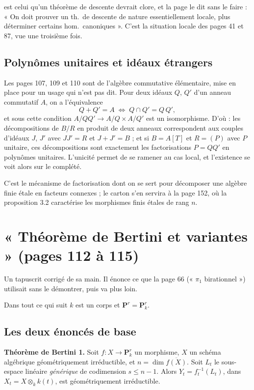 \documentclass[11pt,a4paper]{article}
\begin{document}
est celui qu'un théorème de descente devrait clore, et la page le dit sans le
faire : « On doit prouver un th.\ de descente de nature essentiellement locale,
plus déterminer certains hom.\ canoniques ». C'est la situation locale des
pages 41 et 87, vue une troisième fois.

\subsection*{Polynômes unitaires et idéaux étrangers}

Les pages 107, 109 et 110 sont de l'algèbre commutative élémentaire, mise en
place pour un usage qui n'est pas dit. Pour deux
idéaux $Q$, $Q'$ d'un anneau commutatif $A$, on a l'équivalence
\[
  Q + Q' = A \;\Longleftrightarrow\; Q \cap Q' = Q\,Q' ,
\]
et sous cette condition $A/QQ' \to A/Q \times A/Q'$ est un isomorphisme. D'où :
les décompositions de $B/R$ en produit de deux anneaux correspondent aux
couples d'idéaux $J$, $J'$ avec $JJ' = R$ et $J + J' = B$ ; et si $B = A[T]$ et
$R = (P)$ avec $P$ unitaire, ces décompositions sont exactement les
factorisations $P = QQ'$ en polynômes unitaires. L'unicité permet de se ramener
au cas local, et l'existence se voit alors sur le complété.

C'est le mécanisme de factorisation dont on se sert pour décomposer une algèbre
finie étale en facteurs connexes ; le carton s'en servira à la page 152, où la
proposition 3.2 caractérise les morphismes finis étales de rang $n$.

\section*{« Théorème de Bertini et variantes » (pages 112 à 115)}

Un tapuscrit corrigé de sa main. Il énonce ce que la page 66 (« $\pi_{1}$
birationnel ») utilisait sans le démontrer, puis va plus loin.

Dans tout ce qui suit $k$ est un corps et $\mathbf{P}^{r} = \mathbf{P}^{r}_{k}$.

\subsection*{Les deux énoncés de base}

\textbf{Théorème de Bertini 1.} Soit $f : X \to \mathbf{P}^{r}_{k}$ un
morphisme, $X$ un schéma algébrique géométriquement irréductible, et
$n = \dim \overline{f(X)}$. Soit $L_{t}$ le sous-espace linéaire
\emph{générique} de codimension $s \leqslant n-1$. Alors
$Y_{t} = f_{t}^{-1}(L_{t})$, dans $X_{t} = X \otimes_{k} k(t)$, est
géométriquement irréductible.
\end{document}

